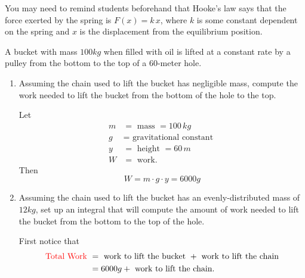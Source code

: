 \documentclass[noinstructornotes]{ximera}
\begin{document}
\begin{problem}
\begin{enumerate}
	\end{enumerate}
		
\end{problem}

\begin{instructorNotes}
You may need to remind students beforehand that Hooke's law says that the force exerted by the spring is $F(x)=k \, x$, where $k$ is some constant dependent on the spring and $x$ is the displacement from the equilibrium position.
\end{instructorNotes}







\begin{problem}
A bucket with mass $100kg$ when filled with oil is lifted at a constant rate by a pulley from the bottom to the top of a $60$-meter hole.
	\begin{enumerate}
		\item  Assuming the chain used to lift the bucket has negligible mass, compute the work needed to lift the bucket from the bottom of the hole to the top.  
		\begin{freeResponse}
		Let
			\begin{align*}
			m &= \text{ mass } = 100 \, kg  \\
			g &= \text{ gravitational constant }  \\
			y &= \text{ height } = 60 \, m  \\
			W &= \text{ work}.
			\end{align*}
		Then
			\[
			W = m \cdot g \cdot y = 6000 g
			\]
		\end{freeResponse}
		
		
		
		\item  Assuming the chain used to lift the bucket has an evenly-distributed mass of $12kg$, set up an integral that will compute the amount of work needed to lift the bucket from the bottom to the top of the hole.  
		\begin{freeResponse}
		First notice that
			\begin{align*}
			\text{{\color{red}Total Work} } &= \text{ work to lift the bucket } + \text{ work to lift the chain}  \\
			&= 6000 g + \text{ work to lift the chain}.
			\end{align*}
		

\end{freeResponse}
\end{enumerate}
\end{problem}
\end{document}
